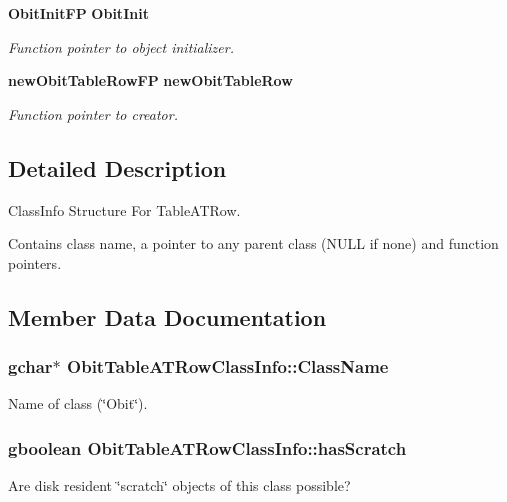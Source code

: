 \begin{CompactItemize}
{\bf Obit\-Init\-FP} {\bf Obit\-Init}
\begin{CompactList}\small\item\em Function pointer to object initializer. \item\end{CompactList}\item 
{\bf new\-Obit\-Table\-Row\-FP} {\bf new\-Obit\-Table\-Row}
\begin{CompactList}\small\item\em Function pointer to creator. \item\end{CompactList}\end{CompactItemize}


\subsection{Detailed Description}
Class\-Info Structure For Table\-ATRow. 

Contains class name, a pointer to any parent class (NULL if none) and function pointers. 



\subsection{Member Data Documentation}
\subsubsection{\setlength{\rightskip}{0pt plus 5cm}gchar$\ast$ {\bf Obit\-Table\-ATRow\-Class\-Info::Class\-Name}}\label{structObitTableATRowClassInfo_o2}


Name of class (\char`\"{}Obit\char`\"{}). 

\subsubsection{\setlength{\rightskip}{0pt plus 5cm}gboolean {\bf Obit\-Table\-ATRow\-Class\-Info::has\-Scratch}}\label{structObitTableATRowClassInfo_o1}


Are disk resident \char`\"{}scratch\char`\"{} objects of this class possible? 

